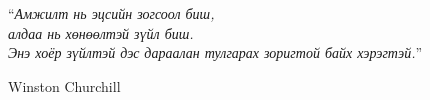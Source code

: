 
\vspace*{0.2\textheight}

\noindent\enquote{\itshape Амжилт нь эцсийн зогсоол биш,\\
алдаа нь хөнөөлтэй зүйл биш. \\
Энэ хоёр зүйлтэй дэс дараалан тулгарах зоригтой
байх хэрэгтэй.}\bigbreak

\hfill Winston Churchill
\normalfont

